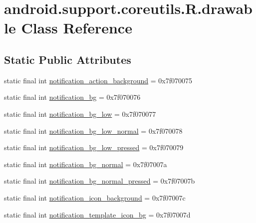 \hypertarget{classandroid_1_1support_1_1coreutils_1_1_r_1_1drawable}{}\section{android.\+support.\+coreutils.\+R.\+drawable Class Reference}
\label{classandroid_1_1support_1_1coreutils_1_1_r_1_1drawable}
\subsection*{Static Public Attributes}
\begin{DoxyCompactItemize}
\item 
static final int \mbox{\hyperlink{classandroid_1_1support_1_1coreutils_1_1_r_1_1drawable_a1e0e57eea57123962ada4e4e23c7f87f}{notification\+\_\+action\+\_\+background}} = 0x7f070075
\item 
static final int \mbox{\hyperlink{classandroid_1_1support_1_1coreutils_1_1_r_1_1drawable_a86831aa5308e6938123b94a9c4d3a35b}{notification\+\_\+bg}} = 0x7f070076
\item 
static final int \mbox{\hyperlink{classandroid_1_1support_1_1coreutils_1_1_r_1_1drawable_a6b16f36ffa4bd83ee689e3071a83baef}{notification\+\_\+bg\+\_\+low}} = 0x7f070077
\item 
static final int \mbox{\hyperlink{classandroid_1_1support_1_1coreutils_1_1_r_1_1drawable_ad0a7fc5f8f7762d33444ae8bed4387a0}{notification\+\_\+bg\+\_\+low\+\_\+normal}} = 0x7f070078
\item 
static final int \mbox{\hyperlink{classandroid_1_1support_1_1coreutils_1_1_r_1_1drawable_a756152a03f6596872023681f768b6589}{notification\+\_\+bg\+\_\+low\+\_\+pressed}} = 0x7f070079
\item 
static final int \mbox{\hyperlink{classandroid_1_1support_1_1coreutils_1_1_r_1_1drawable_a25eb67b2e64e87852fe23836ee3b6add}{notification\+\_\+bg\+\_\+normal}} = 0x7f07007a
\item 
static final int \mbox{\hyperlink{classandroid_1_1support_1_1coreutils_1_1_r_1_1drawable_ad97d2aae6d4170ca51500407c1d0cb5c}{notification\+\_\+bg\+\_\+normal\+\_\+pressed}} = 0x7f07007b
\item 
static final int \mbox{\hyperlink{classandroid_1_1support_1_1coreutils_1_1_r_1_1drawable_aac1c36b1b4016f35a539565ca5e108cd}{notification\+\_\+icon\+\_\+background}} = 0x7f07007c
\item 
static final int \mbox{\hyperlink{classandroid_1_1support_1_1coreutils_1_1_r_1_1drawable_a4522825b1e9785bad81fb01c404719ee}{notification\+\_\+template\+\_\+icon\+\_\+bg}} = 0x7f07007d

\end{DoxyCompactItemize}
